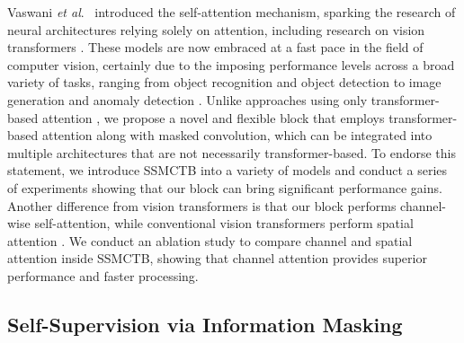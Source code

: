\documentclass[10pt,journal,compsoc]{IEEEtran}
\newcommand{\etal}{\textit{et al}.}
\begin{document}
Vaswani \etal~\cite{Vaswani-NIPS-2017} introduced the self-attention mechanism, sparking the research of neural architectures relying solely on attention, including research on vision transformers \cite{Carion-ECCV-2020,Chen-arXiv-2021,Dosovitskiy-ICLR-2020,Khan-ACS-2021,Parmar-ICML-2018,Ristea-A-2021,Touvron-ICML-2021,Wu-ICCV-2021,Xu-AAAI-2022,Zhang-CVPR-2022,Zheng-BMVC-2021,Zhu-ICLR-2020}. These models are now embraced at a fast pace in the field of computer vision, certainly due to the imposing performance levels across a broad variety of tasks, ranging from object recognition \cite{Dosovitskiy-ICLR-2020,Touvron-ICML-2021,Wu-ICCV-2021} and object detection \cite{Carion-ECCV-2020,Zheng-BMVC-2021,Zhu-ICLR-2020} to image generation \cite{Ristea-A-2021,Xu-AAAI-2022,Zhang-CVPR-2022} and anomaly detection \cite{Wang-ICDM-2022,Jiang-TII-2023,Lee-A-2022b,Mishra-ISIE-2021,Pirnay-ICIAP-2022}. Unlike approaches using only transformer-based attention \cite{Carion-ECCV-2020,Chen-arXiv-2021,Dosovitskiy-ICLR-2020,Khan-ACS-2021,Parmar-ICML-2018,Ristea-A-2021,Touvron-ICML-2021,Wu-ICCV-2021,Zheng-BMVC-2021,Zhu-ICLR-2020,Xu-ICLR-2022}, we propose a novel and flexible block that employs transformer-based attention along with masked convolution, which can be integrated into multiple architectures that are not necessarily transformer-based. To endorse this statement, we introduce SSMCTB into a variety of models and conduct a series of experiments showing that our block can bring significant performance gains. Another difference from vision transformers is that our block performs channel-wise self-attention, while conventional vision transformers perform spatial attention \cite{Dosovitskiy-ICLR-2020}. We conduct an ablation study to compare channel and spatial attention inside SSMCTB, showing that channel attention provides superior performance and faster processing.

\subsection{Self-Supervision via Information Masking} 
\end{document}
